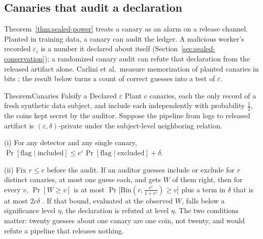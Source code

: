 \subsection{Canaries that audit a declaration}\label{sec:sealed-canary-audit}

\noindent Theorem~\ref{thm:sealed-power} treats a canary as an alarm on a
release channel. Planted in training data, a canary can audit the ledger. A
malicious worker's recorded $\varepsilon_i$ is a number it declared about
itself (Section~\ref{sec:sealed-conservation}); a randomized canary audit can
refute that declaration from the released artifact alone. Carlini et al.\
measure memorization of planted canaries in bits ;
the result below turns a count of correct guesses into a test of
$\varepsilon$.

\begin{pdclaim}{Theorem}{Canaries Falsify a Declared $\varepsilon$}
\setlength{\parskip}{4pt plus 1pt}
\label{thm:sealed-canary-falsify}
Plant $c$ canaries, each the only record of a fresh synthetic data subject, and
include each independently with probability $\tfrac12$, the coins kept secret
by the auditor. Suppose the pipeline from logs to released artifact is
$(\varepsilon,\delta)$-private under the subject-level neighboring relation.

(i) For any detector and any single canary,
$\Pr[\text{flag}\mid\text{included}]\le
e^{\varepsilon}\Pr[\text{flag}\mid\text{excluded}]+\delta$.

(ii) Fix $r\le c$ before the audit. If an auditor guesses include or exclude for
$r$ distinct canaries, at most one guess each, and gets $W$ of them right, then
for every $v$,
$\Pr[W\ge v]$ is at most
$\Pr\bigl[\mathrm{Bin}(r,\tfrac{e^\varepsilon}{1+e^\varepsilon})\ge v\bigr]$
plus a term in $\delta$ that is at most $2c\delta$ \pdcite{steinke2023onerun}.
If that bound, evaluated at the observed $W$, falls below a significance level
$\eta$, the declaration is refuted at level $\eta$. The two conditions
matter: twenty guesses about one canary are one coin, not twenty, and would
refute a pipeline that releases nothing.
\end{pdclaim}

